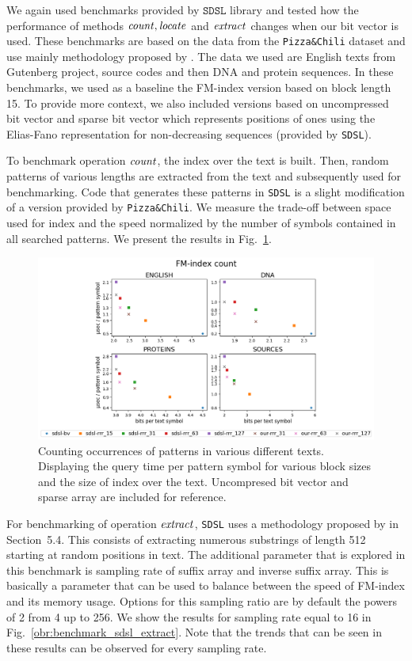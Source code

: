 We again used benchmarks provided by $\texttt{SDSL}$ library and tested how the performance
of methods $\mathit{count}, \mathit{locate}$ and $\mathit{extract}$ changes when our bit vector is used. These
benchmarks are based on the data from the \texttt{Pizza\&Chili} dataset and use mainly methodology
proposed by \cite{ferragina2009compressed}. The data we used are English texts from Gutenberg
project, source codes and then DNA and protein sequences. In these benchmarks, we used as a
baseline the FM-index version based on block length 15. To provide more context, we also included
versions based on uncompressed bit vector and sparse bit vector which represents positions of
ones using the Elias-Fano representation for non-decreasing sequences (provided by \texttt{SDSL}).

To benchmark operation $\mathit{count}$, the index over the text is built. Then, random patterns of
various lengths are extracted from the text and subsequently used for benchmarking. Code
that generates these patterns in \texttt{SDSL} is a slight modification of a version provided
by \texttt{Pizza\&Chili}. We measure the trade-off between space used for index and the speed
normalized by the number of symbols contained in all searched patterns. We present the results
in Fig.~\ref{obr:benchmark_sdsl_count}.

\begin{figure}
	\centerline{
		\includegraphics[width=\textwidth, height=0.4\textheight]{images/vysledky_sdsl_count}
	}
	\caption[TODO]{Counting occurrences of patterns in various different texts. Displaying
	the query time per pattern symbol for various block sizes and the size of index over the
	text. Uncompresed bit vector and sparse array are included for reference. 
	}
	\label{obr:benchmark_sdsl_count}
\end{figure}

For benchmarking of operation $\mathit{extract}$, \texttt{SDSL} uses a methodology proposed by
\cite{ferragina2009compressed} in Section~5.4. This consists of extracting numerous
substrings of length 512 starting at random positions in text. The additional parameter
that is explored in this benchmark is sampling rate of suffix array and inverse suffix array.
This is basically a parameter that can be used to balance between the speed of FM-index and
its memory usage. Options for this sampling ratio are by default the powers of 2 from 4 up to
256. We show the results for sampling rate equal to 16 in Fig.~\ref{obr:benchmark_sdsl_extract}.
Note that the trends that can be seen in these results can be observed for every sampling rate.

